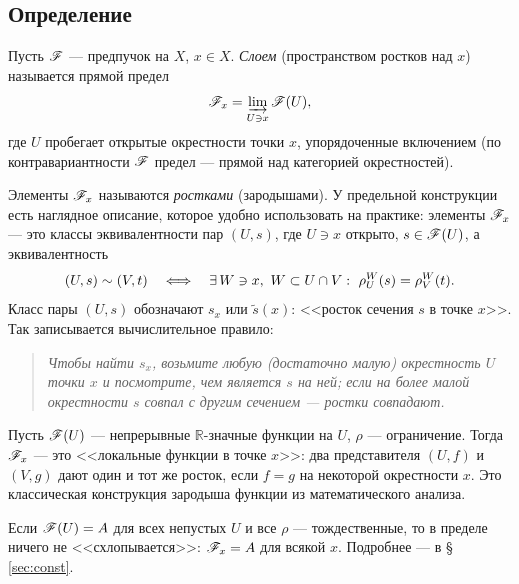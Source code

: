 
\subsection{Определение}
\leavevmode\par
\begin{defn}
Пусть $\mathscr{F}$ --- предпучок на $X$, $x\in X$. \emph{Слоем}
(пространством ростков над $x$) называется прямой предел
\begin{equation}\label{eq:stalk}
 \mathscr{F}_x=\varinjlim_{U\ni x}\mathscr{F}(U),
\end{equation}
где $U$ пробегает открытые окрестности точки $x$, упорядоченные
включением (по контравариантности $\mathscr{F}$ предел --- прямой над
категорией окрестностей).
\end{defn}

Элементы $\mathscr{F}_x$ называются \emph{ростками} (зародышами). У
предельной конструкции есть наглядное описание, которое удобно
использовать на практике: элементы $\mathscr{F}_x$ --- это классы
эквивалентности пар $(U,s)$, где $U\ni x$ открыто, $s\in\mathscr{F}(U)$, а
эквивалентность
\[
 (U,s)\sim(V,t)
 \quad\Longleftrightarrow\quad
 \exists\, W\ni x,\ W\subset U\cap V:\ \res^{W}_{U}(s)=\res^{W}_{V}(t).
\]
Класс пары $(U,s)$ обозначают $s_x$ или $\tilde s(x)$: <<росток
сечения $s$ в точке $x$>>. Так записывается вычислительное правило:

\begin{quote}
\itshape Чтобы найти $s_x$, возьмите любую (достаточно малую)
окрестность $U$ точки $x$ и посмотрите, чем является $s$ на ней;
если на более малой окрестности $s$ совпал с другим сечением ---
ростки совпадают.
\end{quote}

\begin{exm}
Пусть $\mathscr{F}(U)$ --- непрерывные $\mathbb{R}$-значные функции на
$U$, $\rho$ --- ограничение. Тогда $\mathscr{F}_x$ --- это <<локальные
функции в точке $x$>>: два представителя $(U,f)$ и $(V,g)$ дают один
и тот же росток, если $f=g$ на некоторой окрестности $x$. Это
классическая конструкция зародыша функции из математического анализа.
\end{exm}

\begin{exm}
Если $\mathscr{F}(U)=A$ для всех непустых $U$ и все $\rho$ ---
тождественные, то в пределе ничего не <<схлопывается>>:
$\mathscr{F}_x=A$ для всякой $x$. Подробнее --- в
\S\,\ref{sec:const}.\end{exm}

